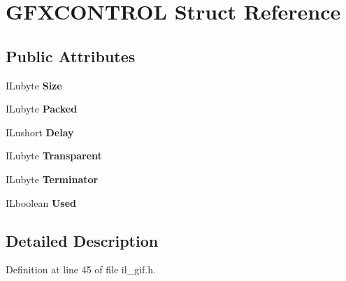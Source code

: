 \hypertarget{structGFXCONTROL}{}\section{G\+F\+X\+C\+O\+N\+T\+R\+OL Struct Reference}
\label{structGFXCONTROL}
\subsection*{Public Attributes}
\begin{DoxyCompactItemize}
\item 
\mbox{\label{structGFXCONTROL_a871bbc0ef2b343fc7579118ede7bf2da}} 
I\+Lubyte {\bfseries Size}
\item 
\mbox{\label{structGFXCONTROL_abacf5a201a230440aab56a77694f8f59}} 
I\+Lubyte {\bfseries Packed}
\item 
\mbox{\label{structGFXCONTROL_a9664b2acbb021cbc6e9a28a485e2af35}} 
I\+Lushort {\bfseries Delay}
\item 
\mbox{\label{structGFXCONTROL_a2e42ccf1291320cfe6aafb6791d53f56}} 
I\+Lubyte {\bfseries Transparent}
\item 
\mbox{\label{structGFXCONTROL_af37288080a2695c557bed1d652a3a20f}} 
I\+Lubyte {\bfseries Terminator}
\item 
\mbox{\label{structGFXCONTROL_a844a2bbbdc3a9869f9505bed324481bb}} 
I\+Lboolean {\bfseries Used}
\end{DoxyCompactItemize}


\subsection{Detailed Description}


Definition at line 45 of file il\+\_\+gif.\+h.



